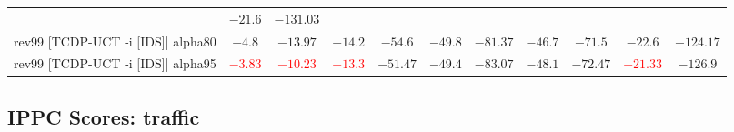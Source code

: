 \documentclass{article}
\begin{document}
\begin{tabular}{|l|r@{$\pm$}rr@{$\pm$}rr@{$\pm$}rr@{$\pm$}rr@{$\pm$}rr@{$\pm$}rr@{$\pm$}rr@{$\pm$}rr@{$\pm$}rr@{$\pm$}r|}
& \multicolumn{2}{c}{\textbf{$-21.6$}}
& \multicolumn{2}{c|}{$-131.03$}
\\
rev99 [TCDP-UCT -i [IDS]] alpha80
& \multicolumn{2}{c}{$-4.8$}
& \multicolumn{2}{c}{$-13.97$}
& \multicolumn{2}{c}{\textbf{$-14.2$}}
& \multicolumn{2}{c}{$-54.6$}
& \multicolumn{2}{c}{\textbf{$-49.8$}}
& \multicolumn{2}{c}{$-81.37$}
& \multicolumn{2}{c}{\textbf{$-46.7$}}
& \multicolumn{2}{c}{$-71.5$}
& \multicolumn{2}{c}{\textbf{$-22.6$}}
& \multicolumn{2}{c|}{$-124.17$}
\\
rev99 [TCDP-UCT -i [IDS]] alpha95
& \multicolumn{2}{c}{\textbf{\textcolor{red}{$-3.83$}}}
& \multicolumn{2}{c}{\textbf{\textcolor{red}{$-10.23$}}}
& \multicolumn{2}{c}{\textbf{\textcolor{red}{$-13.3$}}}
& \multicolumn{2}{c}{$-51.47$}
& \multicolumn{2}{c}{\textbf{$-49.4$}}
& \multicolumn{2}{c}{$-83.07$}
& \multicolumn{2}{c}{$-48.1$}
& \multicolumn{2}{c}{$-72.47$}
& \multicolumn{2}{c}{\textbf{\textcolor{red}{$-21.33$}}}
& \multicolumn{2}{c|}{$-126.9$}
\\
\hline
\end{tabular}%

\bigskip

\subsection*{IPPC Scores: traffic}
\end{document}
